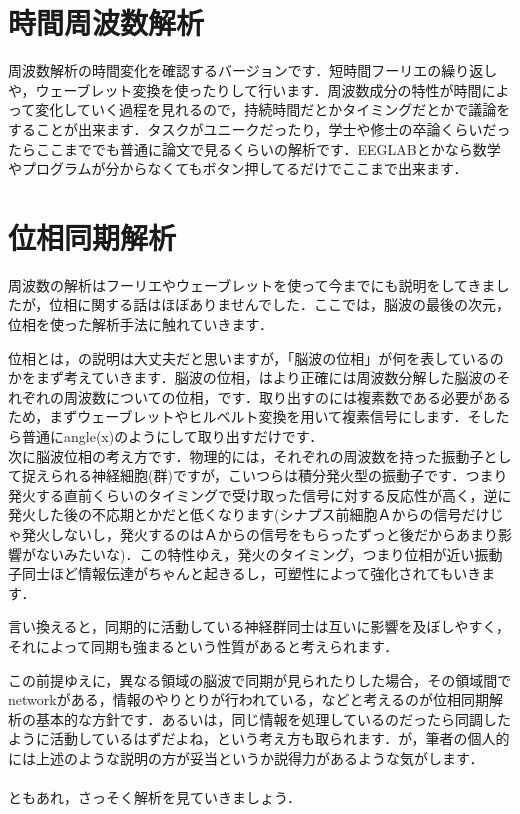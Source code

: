 \documentclass[11pt,a4paper]{ujreport} 	%
\begin{document}
\section{時間周波数解析}
周波数解析の時間変化を確認するバージョンです．短時間フーリエの繰り返しや，ウェーブレット変換を使ったりして行います．周波数成分の特性が時間によって変化していく過程を見れるので，持続時間だとかタイミングだとかで議論をすることが出来ます．タスクがユニークだったり，学士や修士の卒論くらいだったらここまででも普通に論文で見るくらいの解析です．EEGLABとかなら数学やプログラムが分からなくてもボタン押してるだけでここまで出来ます．

\section{位相同期解析}
周波数の解析はフーリエやウェーブレットを使って今までにも説明をしてきましたが，位相に関する話はほぼありませんでした．ここでは，脳波の最後の次元，位相を使った解析手法に触れていきます．

位相とは，の説明は大丈夫だと思いますが，「脳波の位相」が何を表しているのかをまず考えていきます．脳波の位相，はより正確には周波数分解した脳波のそれぞれの周波数についての位相，です．取り出すのには複素数である必要があるため，まずウェーブレットやヒルベルト変換を用いて複素信号にします．そしたら普通にangle(x)のようにして取り出すだけです．\\

次に脳波位相の考え方です．物理的には，それぞれの周波数を持った振動子として捉えられる神経細胞(群)ですが，こいつらは積分発火型の振動子です．つまり発火する直前くらいのタイミングで受け取った信号に対する反応性が高く，逆に発火した後の不応期とかだと低くなります(シナプス前細胞Ａからの信号だけじゃ発火しないし，発火するのはＡからの信号をもらったずっと後だからあまり影響がないみたいな)．この特性ゆえ，発火のタイミング，つまり位相が近い振動子同士ほど情報伝達がちゃんと起きるし，可塑性によって強化されてもいきます．

言い換えると，同期的に活動している神経群同士は互いに影響を及ぼしやすく，それによって同期も強まるという性質があると考えられます．

この前提ゆえに，異なる領域の脳波で同期が見られたりした場合，その領域間でnetworkがある，情報のやりとりが行われている，などと考えるのが位相同期解析の基本的な方針です．あるいは，同じ情報を処理しているのだったら同調したように活動しているはずだよね，という考え方も取られます．が，筆者の個人的には上述のような説明の方が妥当というか説得力があるような気がします．\\
\\
ともあれ，さっそく解析を見ていきましょう．
\end{document}
